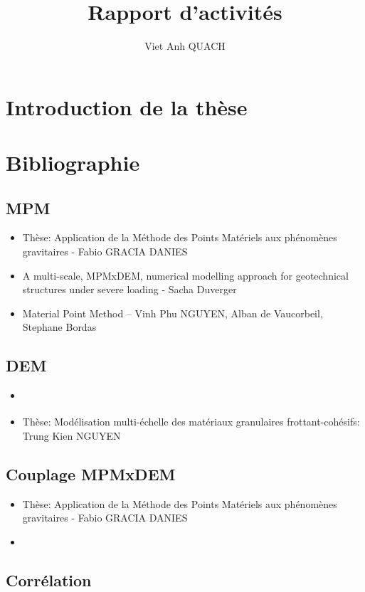 \documentclass[a4paper,12pt]{report}
\title{Rapport d'activités}
\author{Viet Anh QUACH}
\begin{document}
\maketitle
\tableofcontents

\setcounter{secnumdepth}{4}

\chapter{Introduction de la thèse}


\chapter{Bibliographie}
\section{MPM}
\begin{itemize}
\item Thèse: Application de la Méthode des Points Matériels aux phénomènes gravitaires - Fabio GRACIA DANIES
\item A multi-scale, MPMxDEM, numerical modelling approach for geotechnical structures under severe loading - Sacha Duverger
\item Material Point Method -- Vinh Phu NGUYEN, Alban de Vaucorbeil, Stephane Bordas
\end{itemize}
\section{DEM}
\begin{itemize}
      \item \cite{combe2023demlecture}
      \item Thèse: Modélisation multi-échelle des matériaux granulaires frottant-cohésifs: Trung Kien NGUYEN
\end{itemize}

\section{Couplage MPMxDEM}
\begin{itemize}
      \item Thèse: Application de la Méthode des Points Matériels aux phénomènes gravitaires - Fabio GRACIA DANIES
      \item \cite{richefeu2025mpmxdem}
\end{itemize}
\section{Corrélation}
\end{document}
